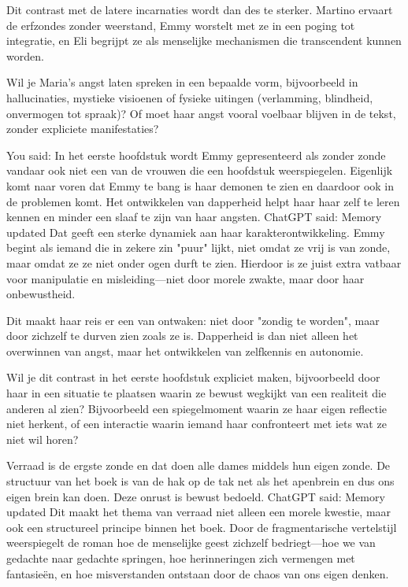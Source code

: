 Dit contrast met de latere incarnaties wordt dan des te sterker. Martino ervaart de erfzondes zonder weerstand, Emmy worstelt met ze in een poging tot integratie, en Eli begrijpt ze als menselijke mechanismen die transcendent kunnen worden.

Wil je Maria’s angst laten spreken in een bepaalde vorm, bijvoorbeeld in hallucinaties, mystieke visioenen of fysieke uitingen (verlamming, blindheid, onvermogen tot spraak)? Of moet haar angst vooral voelbaar blijven in de tekst, zonder expliciete manifestaties?

You said:
In het eerste hoofdstuk wordt Emmy gepresenteerd als zonder zonde vandaar ook niet een van de vrouwen die een hoofdstuk weerspiegelen. Eigenlijk komt naar voren dat Emmy te bang is haar demonen te zien en daardoor ook in de problemen komt. Het ontwikkelen van dapperheid helpt haar haar zelf te leren kennen en minder een slaaf te zijn van haar angsten.
ChatGPT said:
Memory updated
Dat geeft een sterke dynamiek aan haar karakterontwikkeling. Emmy begint als iemand die in zekere zin "puur" lijkt, niet omdat ze vrij is van zonde, maar omdat ze ze niet onder ogen durft te zien. Hierdoor is ze juist extra vatbaar voor manipulatie en misleiding—niet door morele zwakte, maar door haar onbewustheid.

Dit maakt haar reis er een van ontwaken: niet door "zondig te worden", maar door zichzelf te durven zien zoals ze is. Dapperheid is dan niet alleen het overwinnen van angst, maar het ontwikkelen van zelfkennis en autonomie.

Wil je dit contrast in het eerste hoofdstuk expliciet maken, bijvoorbeeld door haar in een situatie te plaatsen waarin ze bewust wegkijkt van een realiteit die anderen al zien? Bijvoorbeeld een spiegelmoment waarin ze haar eigen reflectie niet herkent, of een interactie waarin iemand haar confronteert met iets wat ze niet wil horen?

Verraad is de ergste zonde en dat doen alle dames middels hun eigen zonde.
De structuur van het boek is van de hak op de tak net als het apenbrein en dus ons eigen brein kan doen. Deze onrust is bewust bedoeld.
ChatGPT said:
Memory updated
Dit maakt het thema van verraad niet alleen een morele kwestie, maar ook een structureel principe binnen het boek. Door de fragmentarische vertelstijl weerspiegelt de roman hoe de menselijke geest zichzelf bedriegt—hoe we van gedachte naar gedachte springen, hoe herinneringen zich vermengen met fantasieën, en hoe misverstanden ontstaan door de chaos van ons eigen denken.

